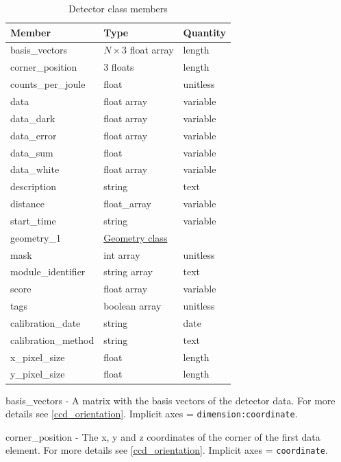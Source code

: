\documentclass[usletter,11pt]{article}
\newcommand{\member}[2]
{ \noindent
{ \color{softBlue}  #1 - } #2
\vspace{0.2cm}
}
\begin{document}
\begin{table}[h!]\sffamily \footnotesize
\caption{Detector class members}

\begin{tabular}{p{4.5cm} p{4.5cm}  p{2.5cm} }
\toprule
\bfseries Member     & \bfseries Type & \bfseries Quantity \\
\midrule


basis\_vectors & $N \times 3$ float array & length \\ 
corner\_position & 3 floats & length \\
counts\_per\_joule & float & unitless \\ 
data     & float array & variable  \\
data\_dark & float array & variable \\
data\_error & float array & variable \\
data\_sum & float & variable \\
data\_white & float array & variable \\
description & string & text \\
distance & float\_array & variable \\
start\_time & string & variable \\
geometry\_1 &  \hyperref[table:geometry]{Geometry class} & \\
mask & int array & unitless \\
module\_identifier & string array & text \\
score & float array & variable \\
tags & boolean array & unitless \\
calibration\_date & string & date \\
calibration\_method & string & text \\
x\_pixel\_size & float & length  \\
y\_pixel\_size & float & length \\


\bottomrule
\end{tabular}
\end{table}

\member{basis\_vectors}{A matrix with the basis vectors of the
  detector data. For more details see \ref{ccd_orientation}. Implicit axes =
  {\tt dimension:coordinate}.
}

\member{corner\_position}{The x, y and z coordinates of the corner of
  the first data element. For more details see \ref{ccd_orientation}. Implicit
  axes = {\tt coordinate}.
}
\end{document}
